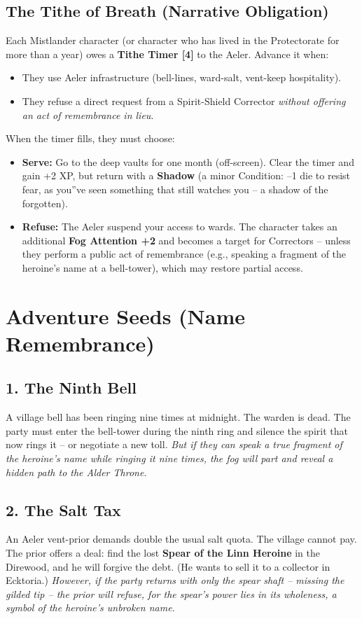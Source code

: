 \documentclass[12pt]{article}
\begin{document}
\subsection{The Tithe of Breath (Narrative Obligation)}
Each Mistlander character (or character who has lived in the Protectorate for more than a year) owes a \textbf{Tithe Timer [4]} to the Aeler. Advance it when:
\begin{itemize}[leftmargin=*]
  \item They use Aeler infrastructure (bell-lines, ward-salt, vent-keep hospitality).
  \item They refuse a direct request from a Spirit-Shield Corrector \textit{without offering an act of remembrance in lieu}.
\end{itemize}
When the timer fills, they must choose:
\begin{itemize}[leftmargin=*]
  \item \textbf{Serve:} Go to the deep vaults for one month (off-screen). Clear the timer and gain +2 XP, but return with a \textbf{Shadow} (a minor Condition: --1 die to resist fear, as you''ve seen something that still watches you -- a shadow of the forgotten).
  \item \textbf{Refuse:} The Aeler suspend your access to wards. The character takes an additional \textbf{Fog Attention +2} and becomes a target for Correctors -- unless they perform a public act of remembrance (e.g., speaking a fragment of the heroine's name at a bell-tower), which may restore partial access.
\end{itemize}

\section{Adventure Seeds (Name Remembrance)}

\subsection{1. The Ninth Bell}
A village bell has been ringing nine times at midnight. The warden is dead. The party must enter the bell-tower during the ninth ring and silence the spirit that now rings it -- or negotiate a new toll. \textit{But if they can speak a true fragment of the heroine's name while ringing it nine times, the fog will part and reveal a hidden path to the Alder Throne.}

\subsection{2. The Salt Tax}
An Aeler vent-prior demands double the usual salt quota. The village cannot pay. The prior offers a deal: find the lost \textbf{Spear of the Linn Heroine} in the Direwood, and he will forgive the debt. (He wants to sell it to a collector in Ecktoria.) \textit{However, if the party returns with only the spear shaft -- missing the gilded tip -- the prior will refuse, for the spear's power lies in its wholeness, a symbol of the heroine's unbroken name.}
\end{document}
